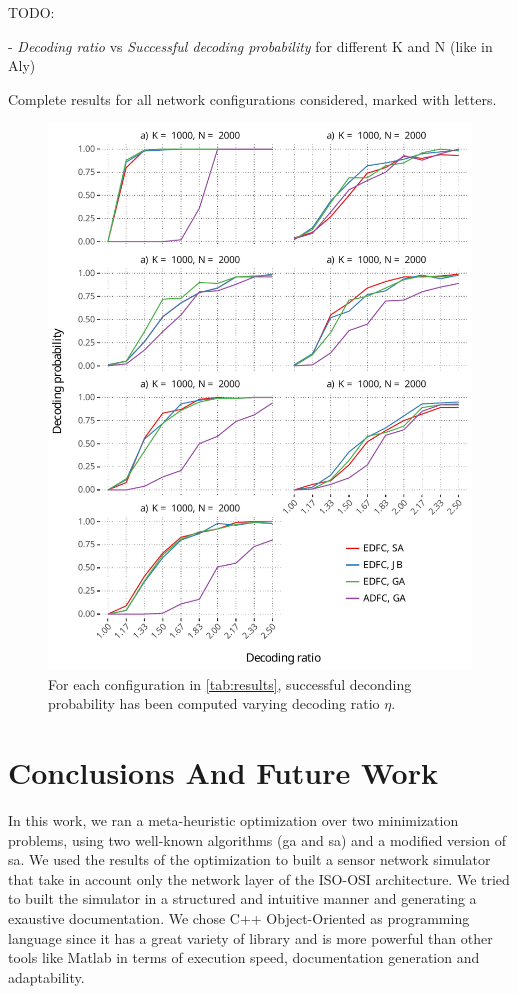 \documentclass[12pt,journal,draftclsnofoot,onecolumn]{IEEEtran}
\begin{document}
TODO:

- \emph{Decoding ratio} vs \emph{Successful decoding probability} for different K and N (like in Aly)

\begin{table}[htp]
	\centering
	
	\caption{Complete results for all network configurations considered, marked with letters.}
	\label{tab:results}
\end{table}

\begin{figure}[htp]
	\label{fig:eta_vs_prob}
	\includegraphics[]{figures/eta_vs_prob.pdf}
	\caption{For each configuration in \autoref{tab:results}, successful deconding probability has been computed varying decoding ratio $\eta$.}
\end{figure}

\glsresetall
\section{Conclusions And Future Work}\label{sec:conclusions}
In this work, we ran a meta-heuristic optimization over two minimization problems, using two well-known algorithms (\gls{ga} and \gls{sa}) and a modified version of \gls{sa}.
We used the results of the optimization to built a sensor network simulator that take in account only the network layer of the ISO-OSI architecture.
We tried to built the simulator in a structured and intuitive manner and generating a exaustive documentation.
We chose C++ Object-Oriented as programming language since it has a great variety of library and is more powerful than other tools like Matlab in terms of execution speed, documentation generation and adaptability.



\end{document}
